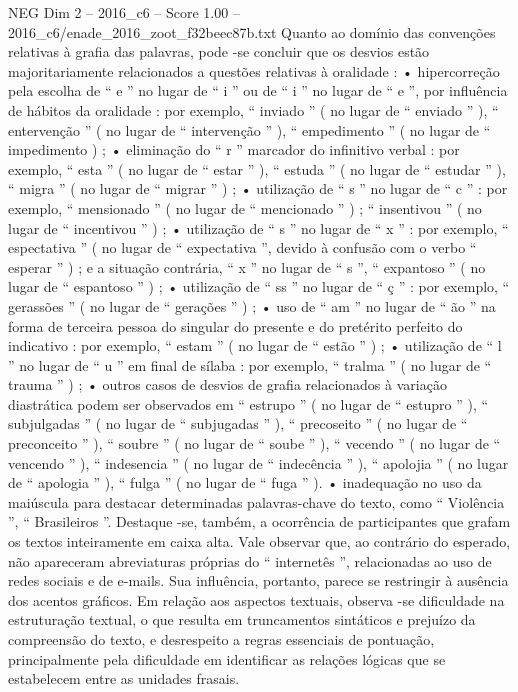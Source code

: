 \begin{textsample}{NEG Dim 2 – 2016\_c6 – Score 1.00 – 2016\_c6/enade\_2016\_zoot\_f32beec87b.txt}
Quanto ao domínio das convenções relativas à grafia das palavras, pode -se concluir que os desvios estão majoritariamente relacionados a questões relativas à oralidade : • hipercorreção pela escolha de “ e ” no lugar de “ i ” ou de “ i ” no lugar de “ e ”, por influência de hábitos da oralidade : por exemplo, “ inviado ” ( no lugar de “ enviado ” ), “ entervenção ” ( no lugar de “ intervenção ” ), “ empedimento ” ( no lugar de “ impedimento ) ; • eliminação do “ r ” marcador do infinitivo verbal : por exemplo, “ esta ” ( no lugar de “ estar ” ), “ estuda ” ( no lugar de “ estudar ” ), “ migra ” ( no lugar de “ migrar ” ) ; • utilização de “ s ” no lugar de “ c ” : por exemplo, “ mensionado ” ( no lugar de “ mencionado ” ) ; “ insentivou ” ( no lugar de “ incentivou ” ) ; • utilização de “ s ” no lugar de “ x ” : por exemplo, “ espectativa ” ( no lugar de “ expectativa ”, devido à confusão com o verbo “ esperar ” ) ; e a situação contrária, “ x ” no lugar de “ s ”, “ expantoso ” ( no lugar de “ espantoso ” ) ; • utilização de “ ss ” no lugar de “ ç ” : por exemplo, “ gerassões ” ( no lugar de “ gerações ” ) ; • uso de “ am ” no lugar de “ ão ” na forma de terceira pessoa do singular do presente e do pretérito perfeito do indicativo : por exemplo, “ estam ” ( no lugar de “ estão ” ) ; • utilização de “ l ” no lugar de “ u ” em final de sílaba : por exemplo, “ tralma ” ( no lugar de “ trauma ” ) ; • outros casos de desvios de grafia relacionados à variação diastrática podem ser observados em “ estrupo ” ( no lugar de “ estupro ” ), “ subjulgadas ” ( no lugar de “ subjugadas ” ), “ precoseito ” ( no lugar de “ preconceito ” ), “ soubre ” ( no lugar de “ soube ” ), “ vecendo ” ( no lugar de “ vencendo ” ), “ indesencia ” ( no lugar de “ indecência ” ), “ apolojia ” ( no lugar de “ apologia ” ), “ fulga ” ( no lugar de “ fuga ” ). • inadequação no uso da maiúscula para destacar determinadas palavras-chave do texto, como “ Violência ”, “ Brasileiros ”.
Destaque -se, também, a ocorrência de participantes que grafam os textos inteiramente em caixa alta.
Vale observar que, ao contrário do esperado, não apareceram abreviaturas próprias do “ internetês ”, relacionadas ao uso de redes sociais e de e-mails.
Sua influência, portanto, parece se restringir à ausência dos acentos gráficos.
Em relação aos aspectos textuais, observa -se dificuldade na estruturação textual, o que resulta em truncamentos sintáticos e prejuízo da compreensão do texto, e desrespeito a regras essenciais de pontuação, principalmente pela dificuldade em identificar as relações lógicas que se estabelecem entre as unidades frasais.

\end{textsample}
